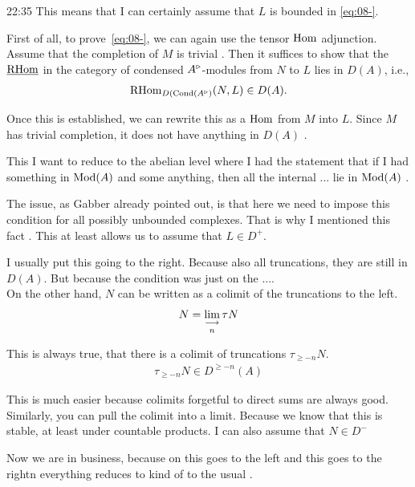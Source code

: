 \begin{unfinished}{22:35}
This means that I can certainly assume that $L$ is bounded in \ref{eq:08-}. 

First of all, to prove~\ref{eq:08-}, we can again use the tensor $\operatorname{Hom}$ adjunction. Assume that the completion of $M$ is trivial . Then it suffices to show that the $\operatorname{\underline{RHom}}$ in the category of condensed $A^\triangleright$-modules from $N$ to $L$ lies in $D(A)$, i.e.,
\begin{align*}
\operatorname{RHom}_{D(\mathrm{Cond}(A^\triangleright)}(N,L) \in D(A).
\end{align*}

Once this is established, we can rewrite this as a $\operatorname{Hom}$ from $M$ into $L$. Since $M$ has trivial completion, it does not have anything in $D(A)$ .

This  I want to reduce to the abelian level where I had the statement that if I had something in $\operatorname{Mod}(A)$ and some anything, then all the internal ... lie in $\operatorname{Mod}(A)$ .


The issue, as Gabber already pointed out, is that here  we need to impose this condition for all possibly unbounded complexes. That is why I mentioned this fact . This at least allows us to assume that $L \in D^+$.


I usually put this going to the right. Because also all truncations, they are still in $D(A)$. But because the condition was just on the ....\\

On the other hand, $N$ can be written as a colimit of the truncations to the left. 
\begin{align*}
N = \colim_n \tau N %
\end{align*}

This is always true, that there is a colimit of truncations $\tau_{\geq -n} N$. 
\begin{align*}
\tau_{\geq -n} N \in D^{\geq -n}(A)
\end{align*}

%
This is much easier because colimits forgetful to direct sums are always good. 
Similarly, you can pull the colimit into a limit. 
Because we know that this is stable, at least under countable products. I can also assume that $N \in  D^-$

Now we are in business, because on this goes to the left and this goes to the rightn everything reduces to kind of to the usual . 


\end{unfinished}
